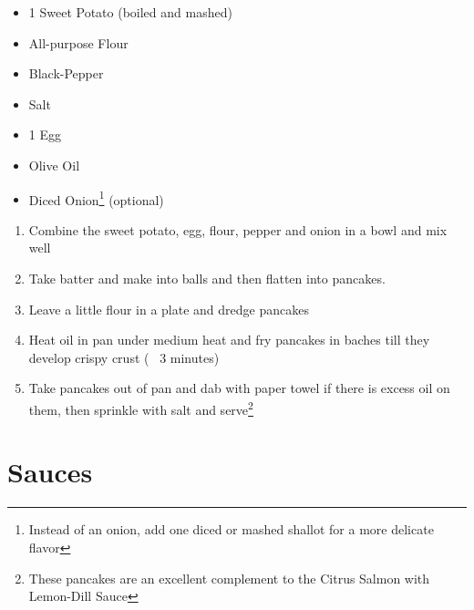 \documentclass[oneside]{recipe}
\newcommand{\recipecolumn}[2]{
	\begin{multicols}{2}
	\raggedcolumns
	#1
	\columnbreak
	#2
	\end{multicols}
}
\begin{document}
\recipecolumn{
	\begin{itemize}
		\item 1 Sweet Potato (boiled and mashed)
		\item All-purpose Flour
		\item Black-Pepper
		\item Salt
		\item 1 Egg
		\item Olive Oil
		\item Diced Onion\footnote{Instead of an onion, add one diced or mashed shallot for a more delicate flavor} (optional)
	\end{itemize}
}{
	\begin{enumerate}
		\item Combine the sweet potato, egg, flour, pepper and onion in a bowl and mix well
		\item Take batter and make into balls and then flatten into pancakes.
		\item Leave a little flour in a plate and dredge pancakes
		\item Heat oil in pan under medium heat and fry pancakes in baches till they develop crispy crust (~ 3 minutes)
		\item Take pancakes out of pan and dab with paper towel if there is excess oil on them, then sprinkle with salt and serve\footnote{These pancakes are an excellent complement to the Citrus Salmon with Lemon-Dill Sauce}
	\end{enumerate}
}

\chapter{Sauces}
\end{document}

